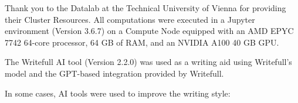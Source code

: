 \documentclass[draft,final]{vutinfth} %
\begin{document}
\begin{acknowledgements*}
Thank you to the Datalab at the Technical University of Vienna for providing their Cluster Resources. All computations were executed in a Jupyter environment (Version 3.6.7) on a Compute Node equipped with an AMD EPYC 7742 64-core processor, 64 GB of RAM, and an NVIDIA A100 40 GB GPU.

The Writefull AI tool (Version 2.2.0) was used as a writing aid using Writefull's model and the GPT-based integration provided by Writefull.

In some cases, AI tools were used to improve the writing style:



\end{acknowledgements*}
\end{document}
